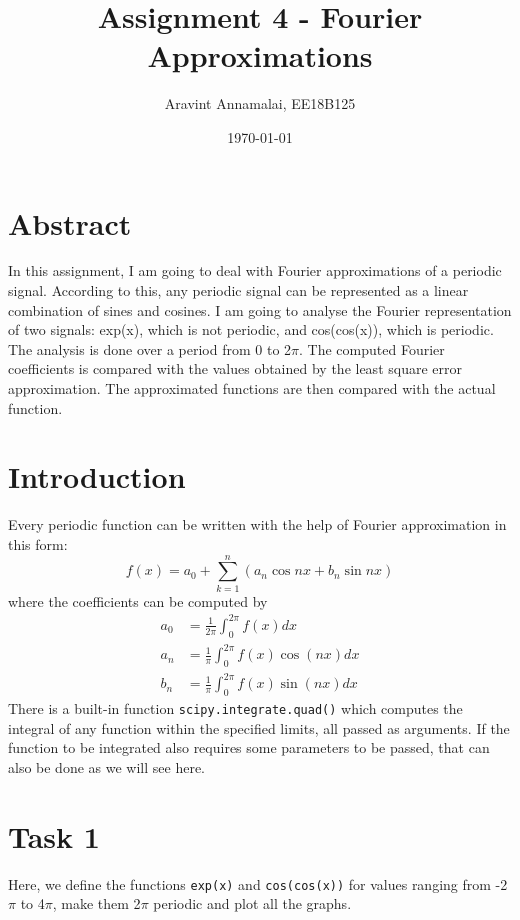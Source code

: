\documentclass[11pt, a4paper]{article}
\title{Assignment 4 - Fourier Approximations}
\author{Aravint Annamalai, EE18B125}
\date{\today}
\begin{document}
\maketitle

\section{Abstract}
In this assignment, I am going to deal with Fourier approximations of a periodic signal. According to this, any periodic signal can be represented as a linear combination of sines and cosines.  I am going to analyse the Fourier representation of two signals: exp(x), which is not periodic, and cos(cos(x)), which is periodic. The analysis is done over a period from 0 to 2$\pi$. The computed Fourier coefficients is compared with the values obtained by the least square error approximation. The approximated functions are then compared with the actual function.

\section{Introduction}
 Every periodic function can be written with the help of Fourier approximation in this form:
\begin{equation}\label{eq:1}
f(x)=a_0+ \sum_{k=1}^{n}(a_n  \cos nx+b_n  \sin nx)
\end{equation}
where the coefficients can be computed by
\begin{equation} \label{eq1}
\begin{split}
a_0 &=\frac{1}{2\pi} \int_0^{2\pi} f(x)dx 
\\a_n &=\frac{1}{\pi} \int_0^{2\pi} f(x)\cos (nx)dx 
\\b_n &=\frac{1}{\pi} \int_0^{2\pi} f(x)\sin (nx)dx
\end{split}
\end{equation}
There is a built-in function \texttt{scipy.integrate.quad()} which computes the integral of any function within the specified limits, all passed as arguments. If the function to be integrated also requires some parameters to be passed, that can also be done as we will see here.

\section{Task 1}
Here, we define the functions \texttt{exp(x)} and \texttt{cos(cos(x))} for values ranging from -2$\pi$ to 4$\pi$, make them 2$\pi$ periodic and plot all the graphs. 
\end{document}

